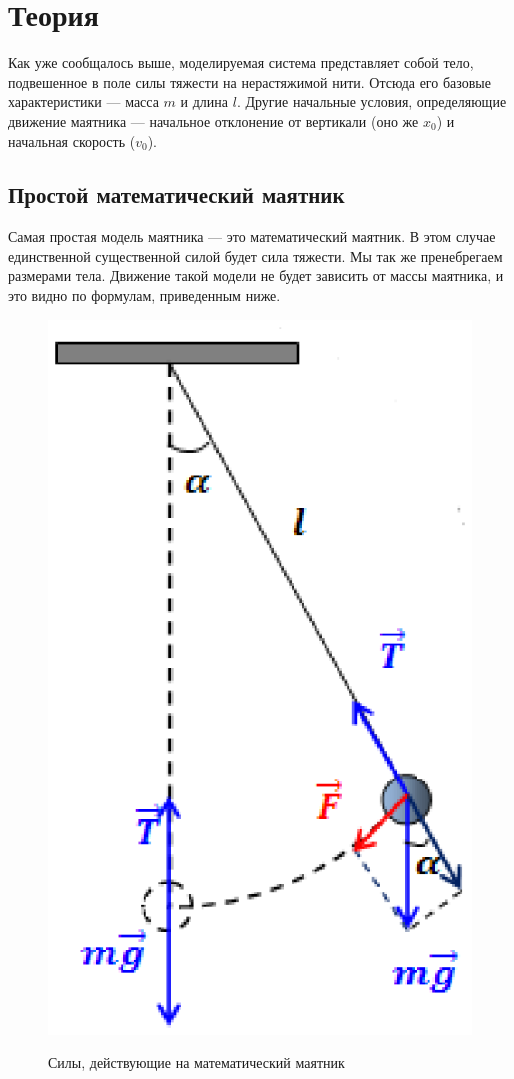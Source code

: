 \section*{Теория}
Как уже сообщалось выше, моделируемая система представляет собой тело, подвешенное в поле силы тяжести на нерастяжимой нити. Отсюда его базовые характеристики --- масса $m$ и длина $l$. Другие начальные условия, определяющие движение маятника --- начальное отклонение от вертикали (оно же $x_0$) и начальная скорость ($v_0$). 
\subsection*{Простой математический маятник}
Самая простая модель маятника --- это математический маятник. В этом случае единственной существенной силой будет сила тяжести. Мы так же пренебрегаем размерами тела. Движение такой модели не будет зависить от массы маятника, и это видно по формулам, приведенным ниже.
\begin{figure}[h!]
	\centering
	\includegraphics{mathp1}\\
	\caption{Силы, действующие на математический маятник }
\end{figure} \\ \\
